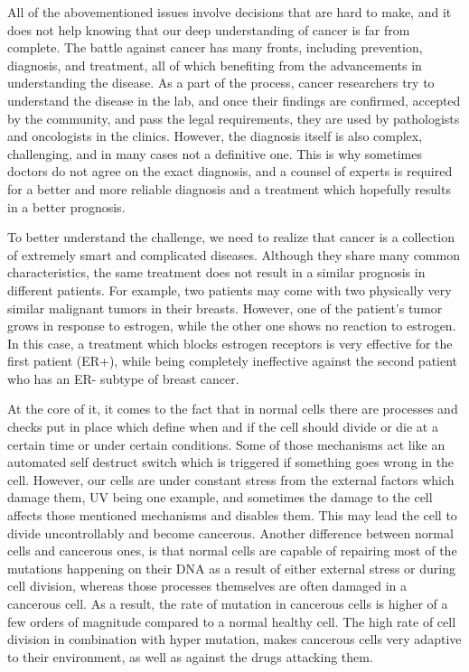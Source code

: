 All of the abovementioned issues involve decisions that are hard to make, and
it does not help knowing that our deep understanding of cancer is far from
complete. The battle against cancer has many fronts, including prevention,
diagnosis, and treatment, all of which benefiting from the advancements in
understanding the disease. As a part of the process, cancer researchers try to
understand the disease in the lab, and once their findings are confirmed,
accepted by the community, and pass the legal requirements, they are used by
pathologists and oncologists in the clinics. However, the diagnosis itself is
also complex, challenging, and in many cases not a definitive one. This is why
sometimes doctors do not agree on the exact diagnosis, and a counsel of experts
is required for a better and more reliable diagnosis and a treatment which
hopefully results in a better prognosis.

To better understand the challenge, we need to realize that cancer is a
collection of extremely smart and complicated diseases. Although they share
many common characteristics, the same treatment does not result in a similar
prognosis in different patients. For example, two patients may come with two
physically very similar malignant tumors in their breasts. However, one of the
patient's tumor grows in response to estrogen, while the other one shows no
reaction to estrogen. In this case, a treatment which blocks estrogen receptors
is very effective for the first patient (ER+), while being completely
ineffective against the second patient who has an ER- subtype of breast cancer.

At the core of it, it comes to the fact that in normal cells there are
processes and checks put in place which define when and if the cell should
divide or die at a certain time or under certain conditions. Some of those
mechanisms act like an automated self destruct switch which is triggered if
something goes wrong in the cell. However, our cells are under constant stress
from the external factors which damage them, UV being one example, and
sometimes the damage to the cell affects those mentioned mechanisms and
disables them. This may lead the cell to divide uncontrollably and become
cancerous. Another difference between normal cells and cancerous ones, is that
normal cells are capable of repairing most of the mutations happening on their
DNA as a result of either external stress or during cell division, whereas
those processes themselves are often damaged in a cancerous cell. As a result,
the rate of mutation in cancerous cells is higher of a few orders of magnitude
compared to a normal healthy cell. The high rate of cell division in
combination with hyper mutation, makes cancerous cells very adaptive to their
environment, as well as against the drugs attacking them.

